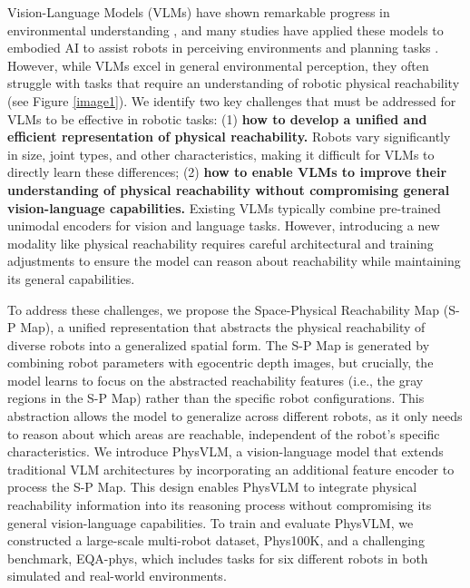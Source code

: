 \documentclass[10pt,twocolumn,letterpaper]{article}
\begin{document}
Vision-Language Models (VLMs) have shown remarkable progress in environmental understanding \cite{lisa, llava, llavanext, internvl, qwen2vl}, and many studies have applied these models to embodied AI to assist robots in perceiving environments and planning tasks \cite{elmm1, elmm2, elmm3, elmm4, openeqa}. However, while VLMs excel in general environmental perception, they often struggle with tasks that require an understanding of robotic physical reachability (see Figure \ref{image1}). We identify two key challenges that must be addressed for VLMs to be effective in robotic tasks: (1) \textbf{how to develop a unified and efficient representation of physical reachability.} Robots vary significantly in size, joint types, and other characteristics, making it difficult for VLMs to directly learn these differences; (2) \textbf{how to enable VLMs to improve their understanding of physical reachability without compromising general vision-language capabilities.} Existing VLMs typically combine pre-trained unimodal encoders for vision and language tasks. However, introducing a new modality like physical reachability requires careful architectural and training adjustments to ensure the model can reason about reachability while maintaining its general capabilities.

To address these challenges, we propose the Space-Physical Reachability Map (S-P Map), a unified representation that abstracts the physical reachability of diverse robots into a generalized spatial form. The S-P Map is generated by combining robot parameters with egocentric depth images, but crucially, the model learns to focus on the abstracted reachability features (i.e., the gray regions in the S-P Map) rather than the specific robot configurations. This abstraction allows the model to generalize across different robots, as it only needs to reason about which areas are reachable, independent of the robot's specific characteristics. We introduce PhysVLM, a vision-language model that extends traditional VLM architectures by incorporating an additional feature encoder to process the S-P Map. This design enables PhysVLM to integrate physical reachability information into its reasoning process without compromising its general vision-language capabilities. To train and evaluate PhysVLM, we constructed a large-scale multi-robot dataset, Phys100K, and a challenging benchmark, EQA-phys, which includes tasks for six different robots in both simulated and real-world environments.
\end{document}
